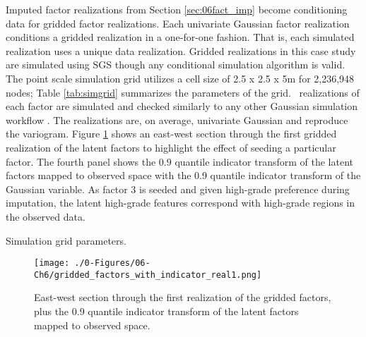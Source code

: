 Imputed factor realizations from Section \ref{sec:06fact_imp} become conditioning data for gridded factor realizations. Each univariate Gaussian factor realization conditions a gridded realization in a one-for-one fashion. That is, each simulated realization uses a unique data realization. Gridded realizations in this case study are simulated using \gls{SGS} though any conditional simulation algorithm is valid. The point scale simulation grid utilizes a cell size of 2.5 x 2.5 x 5m for 2,236,948 nodes; Table \ref{tab:simgrid} summarizes the parameters of the grid. \csnreals \ realizations of each factor are simulated and checked similarly to any other Gaussian simulation workflow \citep{leuangthong2004minimum}. The realizations are, on average, univariate Gaussian and reproduce the variogram. Figure \ref{fig:gridded_factors_with_indicator_real1} shows an east-west section through the first gridded realization of the latent factors to highlight the effect of seeding a particular factor. The fourth panel shows the 0.9 quantile indicator transform of the latent factors mapped to observed space with the 0.9 quantile indicator transform of the Gaussian variable. As factor 3 is seeded and given high-grade preference during imputation, the latent high-grade features correspond with high-grade regions in the observed data.

\begin{table}[!htb]
    \centering
    \caption{Simulation grid parameters.}
    \resizebox{0.9\width}{!}{}
    \label{tab:simgrid}
\end{table}

\begin{figure}[htb!]
    \centering
    \texttt{[image: ./0-Figures/06-Ch6/gridded\_factors\_with\_indicator\_real1.png]}
    \caption{East-west section through the first realization of the gridded factors, plus the 0.9 quantile indicator transform of the latent factors mapped to observed space.}
    \label{fig:gridded_factors_with_indicator_real1}
\end{figure}

